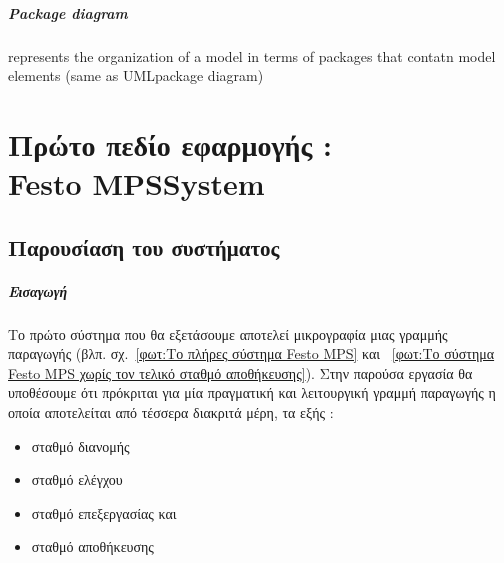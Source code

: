\documentclass[a4paper,12pt,twoside]{report}
\begin{document}
{			\paragraph{Package diagram} {represents the organization of a model in terms of packages that contatn model elements (same as UMLpackage diagram)
			}
		
		
	\chapter{Πρώτο πεδίο εφαρμογής :\\ Festo MPS\textregistered  System}
		\label{κεφ.:Πρώτο πεδίο εφαρμογής : MPS System}

		\section{Παρουσίαση του συστήματος}
		
			\paragraph{Εισαγωγή} {Το πρώτο σύστημα που θα εξετάσουμε αποτελεί μικρογραφία μιας γραμμής παραγωγής {\footnotesize (βλπ. σχ.~\ref{φωτ:Το πλήρες σύστημα Festo MPS} και ~\ref{φωτ:Το σύστημα Festo MPS χωρίς τον τελικό σταθμό αποθήκευσης})}. Στην παρούσα εργασία θα υποθέσουμε ότι πρόκριται για μία πραγματική και λειτουργική γραμμή παραγωγής η οποία αποτελείται από τέσσερα διακριτά μέρη, τα εξής :
			}
			\begin{itemize}
				\item σταθμό διανομής
				\item σταθμό ελέγχου
				\item σταθμό επεξεργασίας και
				\item σταθμό αποθήκευσης
			\end{itemize}
			
}
\end{document}
